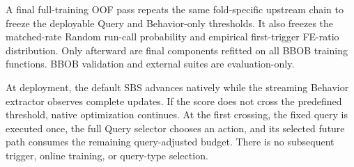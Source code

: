 A final full-training OOF pass repeats the same fold-specific upstream chain to
freeze the deployable Query and Behavior-only thresholds.  It also freezes the
matched-rate Random run-call probability and empirical first-trigger FE-ratio
distribution.  Only afterward are final components refitted on all BBOB
training functions.  BBOB validation and external suites are evaluation-only.

At deployment, the default SBS advances natively while the streaming Behavior
extractor observes complete updates.  If the score does not cross the predefined
threshold, native optimization continues.  At the first crossing, the fixed
query is executed once, the full Query selector chooses an action, and its
selected future path consumes the remaining query-adjusted budget.  There is
no subsequent trigger, online training, or query-type selection.
